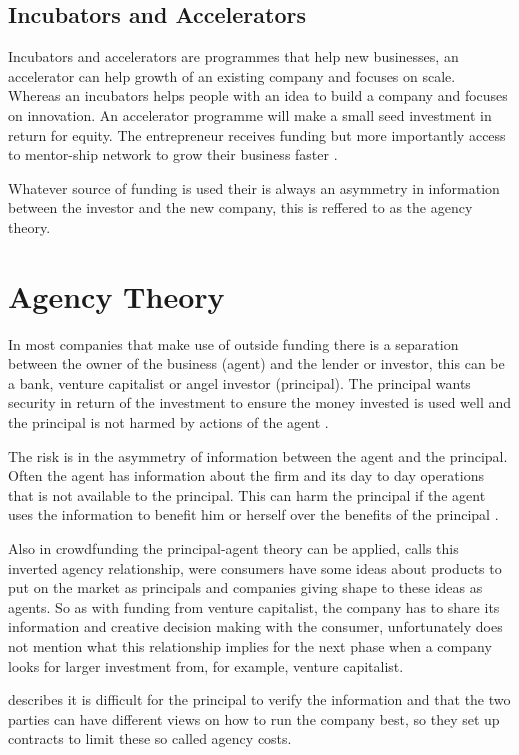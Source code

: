 \documentclass[a4paper, 11pt]{article}
\begin{document}
\subsection{Incubators and Accelerators}
Incubators and accelerators are programmes that help new businesses, an accelerator can help growth of an existing company and focuses on scale. Whereas an incubators helps people with an idea to build a company and focuses on innovation. An accelerator programme will make a small seed investment in return for equity. The entrepreneur receives funding but more importantly access to mentor-ship network to grow their business faster \citep{forrest}.

Whatever source of funding is used their is always an asymmetry in information between the investor and the new company, this is reffered to as the agency theory.

\section{Agency Theory}

In most companies that make use of outside funding there is a separation between
the owner of the business (agent) and the lender or investor, this can be a
bank, venture capitalist or angel investor (principal). The principal wants
security in return of the investment to ensure the money invested is used well
and the principal is not harmed by actions of the agent \citep{jensen1976theory}.

The risk is in the asymmetry of information between the agent and the principal. Often the
agent has information about the firm and its day to day operations that is not
available to the principal. This can harm the principal if the agent uses the
information to benefit him or herself over the benefits of the principal
\citep{Osnabrugge2000}.


Also in crowdfunding the principal-agent theory can be applied, \cite{chaney} calls this inverted agency relationship, were consumers have some ideas about products to put on the market as principals and companies giving shape to these ideas as agents. So as with funding from venture capitalist, the company has to share its information and creative decision making with the consumer, unfortunately \cite{chaney} does not mention what this relationship implies for the next phase when a company looks for larger investment from, for example, venture capitalist. 

\cite{Osnabrugge2000} describes it is difficult for the principal to verify the information and that the two parties can have different views on how to run the company best, so they set up contracts to limit these so called agency costs.
\end{document}
